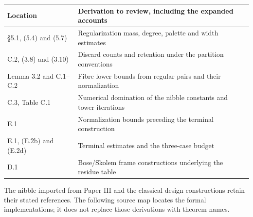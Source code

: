 \documentclass[english,11pt,a4paper]{article}
\newcounter{none}
\begin{document}

{\def\LTcaptype{none} %
\begin{longtable}[c]{@{}
  >{\raggedright\arraybackslash}p{}
  >{\raggedright\arraybackslash}p{}@{}}
\toprule\noalign{}
\begin{minipage}[b]{\linewidth}\raggedright
Location
\end{minipage} & \begin{minipage}[b]{\linewidth}\raggedright
Derivation to review, including the expanded accounts
\end{minipage} \\
\midrule\noalign{}
\endhead
\bottomrule\noalign{}
\endlastfoot
§5.1, (5.4) and (5.7) & Regularization mass, degree, palette and width estimates \\
C.2, (3.8) and (3.10) & Discard counts and retention under the partition conventions \\
Lemma 3.2 and C.1--C.2 & Fibre lower bounds from regular pairs and their normalization \\
C.3, Table C.1 & Numerical domination of the nibble constants and tower iterations \\
E.1 & Normalization bounds preceding the terminal construction \\
E.1, (E.2b) and (E.2d) & Terminal estimates and the three-case budget \\
D.1 & Bose/Skolem frame constructions underlying the residue table \\
\end{longtable}
}

The nibble imported from Paper III and the classical design constructions retain their stated references. The following source map locates the formal implementations; it does not replace those derivations with theorem names.
\end{document}
